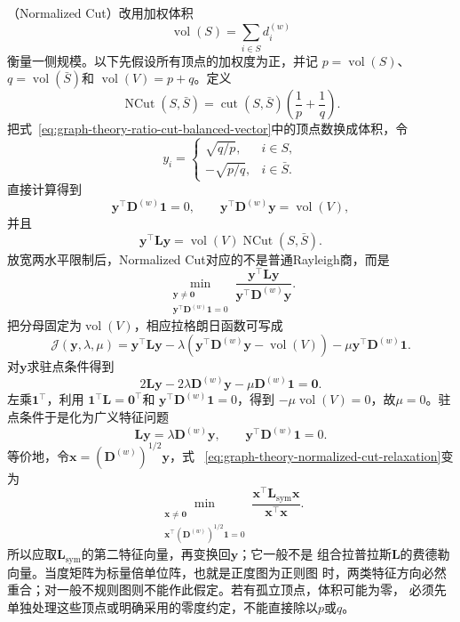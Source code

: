 （Normalized Cut）改用加权体积
\[
  \operatorname{vol}(S)=\sum_{i\in S}d_i^{(w)}
\]
衡量一侧规模。以下先假设所有顶点的加权度为正，并记
\(p=\operatorname{vol}(S)\)、\(q=\operatorname{vol}(\bar S)\)和
\(\operatorname{vol}(V)=p+q\)。定义
\begin{equation}
  \operatorname{NCut}(S,\bar S)
  =
  \operatorname{cut}(S,\bar S)
  \left(\frac1p+\frac1q\right).
  \label{eq:graph-theory-normalized-cut}
\end{equation}
把式~\eqref{eq:graph-theory-ratio-cut-balanced-vector}中的顶点数换成体积，令
\[
  y_i=
  \begin{cases}
    \sqrt{q/p},&i\in S,\\
    -\sqrt{p/q},&i\in\bar S.
  \end{cases}
\]
直接计算得到
\[
  \bm{y}^{\top}\bm{D}^{(w)}\bm{1}=0,\qquad
  \bm{y}^{\top}\bm{D}^{(w)}\bm{y}=\operatorname{vol}(V),
\]
并且
\[
  \bm{y}^{\top}\bm{L}\bm{y}
  =
  \operatorname{vol}(V)\operatorname{NCut}(S,\bar S).
\]
放宽两水平限制后，Normalized Cut对应的不是普通Rayleigh商，而是
\begin{equation}
  \min_{\substack{\bm{y}\neq\bm{0}\\
          \bm{y}^{\top}\bm{D}^{(w)}\bm{1}=0}}
  \frac{\bm{y}^{\top}\bm{L}\bm{y}}
       {\bm{y}^{\top}\bm{D}^{(w)}\bm{y}}.
  \label{eq:graph-theory-normalized-cut-relaxation}
\end{equation}
把分母固定为\(\operatorname{vol}(V)\)，相应拉格朗日函数可写成
\[
  \mathcal{J}(\bm{y},\lambda,\mu)
  =
  \bm{y}^{\top}\bm{L}\bm{y}
  -\lambda\left(
    \bm{y}^{\top}\bm{D}^{(w)}\bm{y}-\operatorname{vol}(V)
  \right)
  -\mu\bm{y}^{\top}\bm{D}^{(w)}\bm{1}.
\]
对\(\bm{y}\)求驻点条件得到
\[
  2\bm{L}\bm{y}
  -2\lambda\bm{D}^{(w)}\bm{y}
  -\mu\bm{D}^{(w)}\bm{1}
  =\bm{0}.
\]
左乘\(\bm{1}^{\top}\)，利用
\(\bm{1}^{\top}\bm{L}=\bm{0}^{\top}\)和
\(\bm{y}^{\top}\bm{D}^{(w)}\bm{1}=0\)，得到
\(-\mu\operatorname{vol}(V)=0\)，故\(\mu=0\)。驻点条件于是化为广义特征问题
\begin{equation}
  \bm{L}\bm{y}=\lambda\bm{D}^{(w)}\bm{y},
  \qquad
  \bm{y}^{\top}\bm{D}^{(w)}\bm{1}=0.
  \label{eq:graph-theory-normalized-cut-generalized-eigenproblem}
\end{equation}
等价地，令\(\bm{x}=(\bm{D}^{(w)})^{1/2}\bm{y}\)，式
~\eqref{eq:graph-theory-normalized-cut-relaxation}变为
\[
  \min_{\substack{\bm{x}\neq\bm{0}\\
        \bm{x}^{\top}(\bm{D}^{(w)})^{1/2}\bm{1}=0}}
  \frac{\bm{x}^{\top}\bm{L}_{\mathrm{sym}}\bm{x}}
       {\bm{x}^{\top}\bm{x}}.
\]
所以应取\(\bm{L}_{\mathrm{sym}}\)的第二特征向量，再变换回\(\bm{y}\)；它一般不是
组合拉普拉斯\(\bm{L}\)的费德勒向量。当度矩阵为标量倍单位阵，也就是正度图为正则图
时，两类特征方向必然重合；对一般不规则图则不能作此假定。若有孤立顶点，体积可能为零，
必须先单独处理这些顶点或明确采用的零度约定，不能直接除以\(p\)或\(q\)。


